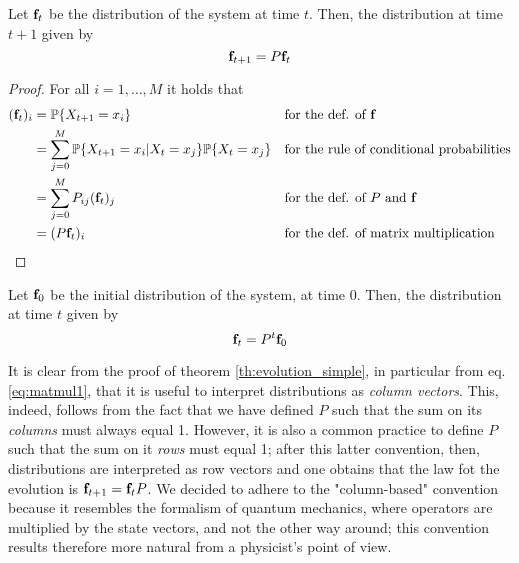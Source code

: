 \begin{theorem} \label{th:evolution_simple}
    Let $\mathbf{f}_t$ be the distribution of the system at time $t$. Then, the distribution at time $t + 1$ given by
    \begin{equation}
        \mathbf{f}_{t+1} = P \mathbf{f}_t
    \end{equation}
\end{theorem}
\begin{proof}
    For all $i = 1,\dots,M$ it holds that
    \begin{align}
        (\mathbf{f}_t)_i
         & = \mathbb{P}\{X_{t+1} = x_i \}                                           &  & \text{for the def. of $\mathbf{f}$}                                     \\
         & = \sum_{j = 0}^M \mathbb{P}\{X_{t+1} = x_i | X_t = x_j\} \mathbb{P}\{X_t = x_j\} &  & \text{for the rule of conditional probabilities}                \\
         & = \sum_{j = 0}^M P_{ij} (\mathbf{f}_t)_j                                   &  & \text{for the def. of $P$ and $\mathbf{f}$} \label{eq:matmul1}          \\
         & = (P \mathbf{f}_t)_i                                                       &  & \text{for the def. of matrix multiplication} \label{eq:matmul2}
    \end{align}

\end{proof}

\begin{corollary} \label{th:evolution_complete}
    Let $\mathbf{f}_0$ be the initial distribution of the system, at time 0. Then, the distribution at time $t$ given by
    \begin{equation}
        \mathbf{f}_t = P^t \mathbf{f}_0
    \end{equation}
\end{corollary}

\begin{remark}
    It is clear from the proof of theorem \ref{th:evolution_simple}, in particular from eq. \ref{eq:matmul1}, that it is useful to interpret distributions as \emph{column vectors}. This, indeed, follows from the fact that we have defined $P$ such that the sum on its \emph{columns} must always equal 1. However, it is also a common practice to define $P$ such that the sum on it \emph{rows} must equal 1; after this latter convention, then, distributions are interpreted as row vectors and one obtains that the law fot the evolution is $\mathbf{f}_{t+1} = \mathbf{f}_t P$. We decided to adhere to the "column-based" convention because it resembles the formalism of quantum mechanics, where operators are multiplied by the state vectors, and not the other way around; this convention results therefore more natural from a physicist's point of view.
\end{remark}

